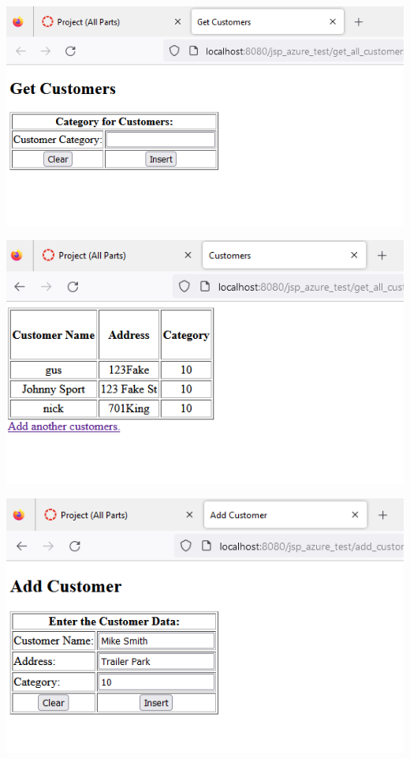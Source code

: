 \documentclass[11pt]{article}
\begin{document}
\includegraphics[width = \textwidth]{web1.png}

\includegraphics[width = \textwidth]{web2.png}

\includegraphics[width = \textwidth]{web3.png}
\end{document}
